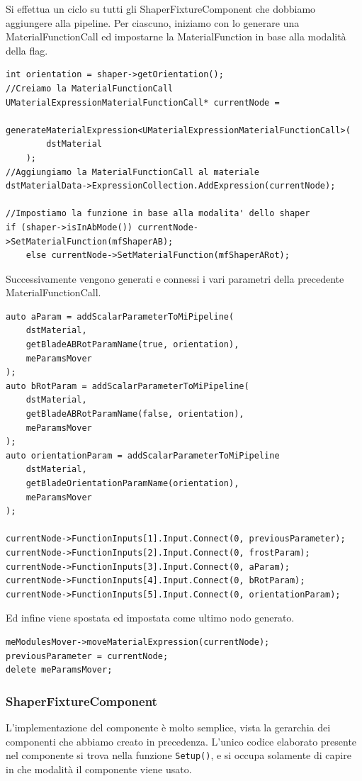 \documentclass[main.tex]{subfiles}
\begin{document}
Si effettua un ciclo su tutti gli ShaperFixtureComponent che dobbiamo aggiungere alla pipeline. Per ciascuno, iniziamo con lo generare una MaterialFunctionCall ed impostarne la MaterialFunction in base alla modalità della flag.
\begin{lstlisting}
int orientation = shaper->getOrientation();
//Creiamo la MaterialFunctionCall
UMaterialExpressionMaterialFunctionCall* currentNode =
    generateMaterialExpression<UMaterialExpressionMaterialFunctionCall>(
        dstMaterial
    );
//Aggiungiamo la MaterialFunctionCall al materiale
dstMaterialData->ExpressionCollection.AddExpression(currentNode);

//Impostiamo la funzione in base alla modalita' dello shaper
if (shaper->isInAbMode()) currentNode->SetMaterialFunction(mfShaperAB);
    else currentNode->SetMaterialFunction(mfShaperARot);
\end{lstlisting}
Successivamente vengono generati e connessi i vari parametri della precedente MaterialFunctionCall.
\begin{lstlisting}
auto aParam = addScalarParameterToMiPipeline(
    dstMaterial,
    getBladeABRotParamName(true, orientation),
    meParamsMover
);
auto bRotParam = addScalarParameterToMiPipeline(
    dstMaterial,
    getBladeABRotParamName(false, orientation),
    meParamsMover
);
auto orientationParam = addScalarParameterToMiPipeline
    dstMaterial,
    getBladeOrientationParamName(orientation),
    meParamsMover
);

currentNode->FunctionInputs[1].Input.Connect(0, previousParameter);
currentNode->FunctionInputs[2].Input.Connect(0, frostParam);
currentNode->FunctionInputs[3].Input.Connect(0, aParam);
currentNode->FunctionInputs[4].Input.Connect(0, bRotParam);
currentNode->FunctionInputs[5].Input.Connect(0, orientationParam);
\end{lstlisting}
Ed infine viene spostata ed impostata come ultimo nodo generato.
\begin{lstlisting}
meModulesMover->moveMaterialExpression(currentNode);
previousParameter = currentNode;
delete meParamsMover;
\end{lstlisting}

\subsubsection{ShaperFixtureComponent}\label{subsec:5_1_ShaperFixtureComponent}
L'implementazione del componente è molto semplice, vista la gerarchia dei componenti che abbiamo creato in precedenza. L'unico codice elaborato presente nel componente si trova nella funzione \lstinline{Setup()}, e si occupa solamente di capire in che modalità il componente viene usato. 
\end{document}
